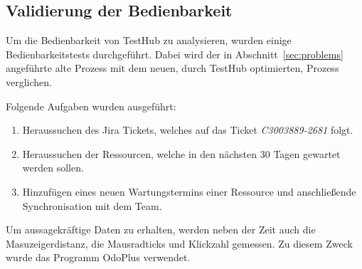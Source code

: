 \subsection{Validierung der Bedienbarkeit}
Um die Bedienbarkeit von TestHub zu analysieren, wurden einige Bedienbarkeitstests durchgeführt.
Dabei wird der in Abschnitt~\ref{sec:problems} angeführte alte Prozess mit dem neuen, durch TestHub optimierten, Prozess verglichen.

Folgende Aufgaben wurden ausgeführt:

\begin{enumerate}
    \item Heraussuchen des \gls{Jira} Tickets, welches auf das Ticket \textit{C3003889-2681} folgt.
    \item Heraussuchen der Ressourcen, welche in den nächsten 30 Tagen gewartet werden sollen.
    \item Hinzufügen eines neuen Wartungstermins einer Ressource und anschließende Synchronisation mit dem Team.
\end{enumerate}

Um aussagekräftige Daten zu erhalten, werden neben der Zeit auch die Masuzeigerdistanz,
die Mausradticks und Klickzahl gemessen. Zu diesem Zweck wurde das Programm OdoPlus
verwendet.

\newpage

